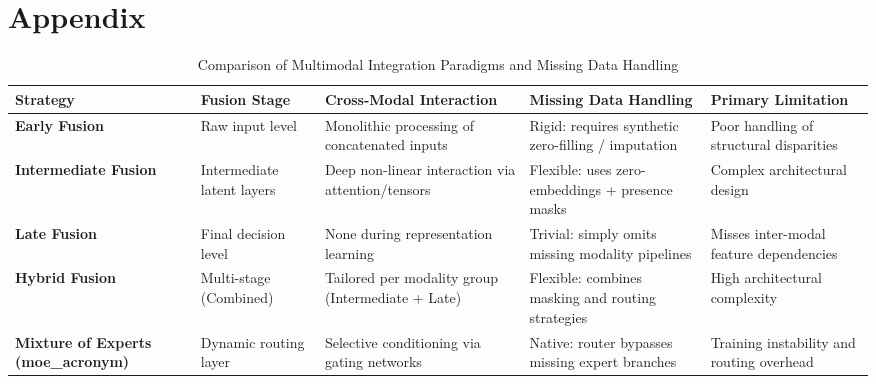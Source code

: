 \documentclass[10pt]{article}
\begin{document}
\section*{Appendix}
\begin{table}[htbp]
\centering
\caption{Comparison of Multimodal Integration Paradigms and Missing Data Handling}
\label{tab:multimodal_strategies}
\begin{tabular}{p{3.0cm} p{3.2cm} p{3.5cm} p{3.8cm} p{2.2cm}}
\hline
\textbf{Strategy} & \textbf{Fusion Stage} & \textbf{Cross-Modal Interaction} & \textbf{Missing Data Handling} & \textbf{Primary Limitation} \\ \hline
\textbf{Early Fusion} & Raw input level & Monolithic processing of concatenated inputs & Rigid: requires synthetic zero-filling / imputation & Poor handling of structural disparities \\
\textbf{Intermediate Fusion} & Intermediate latent layers & Deep non-linear interaction via attention/tensors & Flexible: uses zero-embeddings + presence masks & Complex architectural design \\
\textbf{Late Fusion} & Final decision level & None during representation learning & Trivial: simply omits missing modality pipelines & Misses inter-modal feature dependencies \\
\textbf{Hybrid Fusion} & Multi-stage (Combined) & Tailored per modality group (Intermediate + Late) & Flexible: combines masking and routing strategies & High architectural complexity \\
\textbf{Mixture of Experts (\gls{moe_acronym})} & Dynamic routing layer & Selective conditioning via gating networks & Native: router bypasses missing expert branches & Training instability and routing overhead \\
\hline
\end{tabular}
\end{table}
\end{document}
